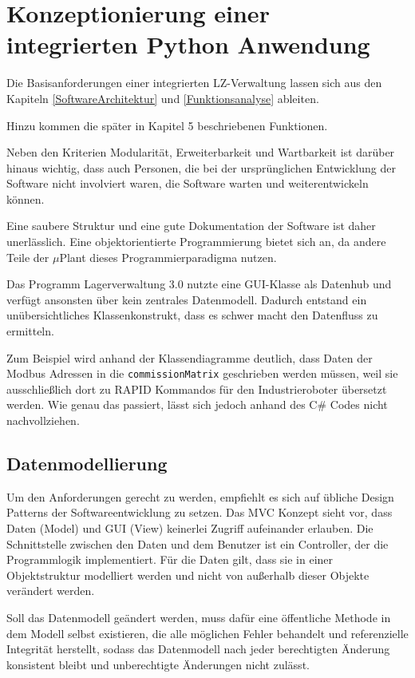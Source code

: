 
\chapter{Konzeptionierung einer integrierten Python Anwendung}\label{PythonApp}

Die Basisanforderungen einer integrierten LZ-Verwaltung lassen sich aus den Kapiteln \ref{SoftwareArchitektur} und \ref{Funktionsanalyse} ableiten.

Hinzu kommen die später in Kapitel 5 beschriebenen Funktionen.

Neben den Kriterien Modularität, Erweiterbarkeit und Wartbarkeit ist darüber hinaus wichtig, dass auch Personen,
die bei der ursprünglichen Entwicklung der Software nicht involviert waren, die Software warten und weiterentwickeln können.

Eine saubere Struktur und eine gute Dokumentation der Software ist daher unerlässlich. 
Eine objektorientierte Programmierung bietet sich an, da andere Teile der $\mu$Plant dieses Programmierparadigma nutzen.

Das Programm \glqq Lagerverwaltung 3.0\grqq{} nutzte eine GUI-Klasse als Datenhub und verfügt ansonsten über kein zentrales Datenmodell.
Dadurch entstand ein unübersichtliches Klassenkonstrukt, dass es schwer macht den Datenfluss zu ermitteln.

Zum Beispiel wird anhand der Klassendiagramme deutlich, dass Daten der Modbus Adressen in die \verb|commissionMatrix|
geschrieben werden müssen, weil sie ausschließlich dort zu RAPID Kommandos für den Industrieroboter übersetzt werden.
Wie genau das passiert, lässt sich jedoch anhand des C\# Codes nicht nachvollziehen.

\section{Datenmodellierung}

Um den Anforderungen gerecht zu werden, empfiehlt es sich auf übliche Design Patterns der Softwareentwicklung zu setzen.
Das MVC Konzept sieht vor, dass Daten (Model) und GUI (View) keinerlei Zugriff aufeinander erlauben.
Die Schnittstelle zwischen den Daten und dem Benutzer ist ein Controller, der die Programmlogik implementiert.
Für die Daten gilt, dass sie in einer Objektstruktur modelliert werden und nicht von außerhalb dieser Objekte verändert
werden.

Soll das Datenmodell geändert werden, muss dafür eine öffentliche Methode in dem Modell selbst existieren,
die alle möglichen Fehler behandelt und referenzielle Integrität herstellt, sodass das Datenmodell nach jeder berechtigten
Änderung konsistent bleibt und unberechtigte Änderungen nicht zulässt.

